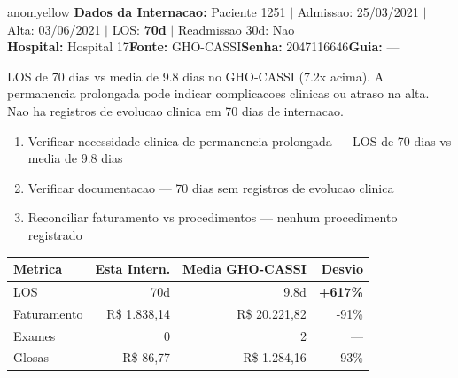 \documentclass[a4paper,10pt]{article}
\begin{document}
\newpage

\begin{anomalycard}[Internacao 1045 | GHO-CASSI | MODERADO (z=2.20)]{anomyellow}
\textbf{Dados da Internacao:} Paciente 1251 $\mid$ Admissao: 25/03/2021 $\mid$ Alta: 03/06/2021 $\mid$ LOS: \textbf{70d} $\mid$ Readmissao 30d: Nao\\
\textbf{Hospital:} Hospital 17\quad\textbf{Fonte:} GHO-CASSI\quad\textbf{Senha:} 2047116646\quad\textbf{Guia:} ---\\
\vspace{2pt}\begin{tcolorbox}[colback=severityred!20,colframe=anomyellow,title={\textbf{Interpretacao de Negocio}},fonttitle=\bfseries\small,left=4pt,right=4pt,top=3pt,bottom=3pt]
{\small LOS de 70 dias vs media de 9.8 dias no GHO-CASSI (7.2x acima). A permanencia prolongada pode indicar complicacoes clinicas ou atraso na alta. Nao ha registros de evolucao clinica em 70 dias de internacao.}
\end{tcolorbox}
\begin{tcolorbox}[colback=severityyellow!30,colframe=anomorange,title={\textbf{Recomendacoes Especificas}},fonttitle=\bfseries\small,left=4pt,right=4pt,top=3pt,bottom=3pt]
\begin{enumerate}[nosep,leftmargin=16pt]
\item {\small Verificar necessidade clinica de permanencia prolongada --- LOS de 70 dias vs media de 9.8 dias}
\item {\small Verificar documentacao --- 70 dias sem registros de evolucao clinica}
\item {\small Reconciliar faturamento vs procedimentos --- nenhum procedimento registrado}
\end{enumerate}
\end{tcolorbox}
\begin{center}\begin{tabular}{l r r r}\toprule\textbf{Metrica} & \textbf{Esta Intern.} & \textbf{Media GHO-CASSI} & \textbf{Desvio} \\\midrule
LOS & 70d & 9.8d & \textcolor{anomred}{\textbf{+617\%}} \\
Faturamento & R\$ 1.838,14 & R\$ 20.221,82 & -91\% \\
Exames & 0 & 2 & --- \\
Glosas & R\$ 86,77 & R\$ 1.284,16 & -93\% \\
\bottomrule\end{tabular}\end{center}


\end{anomalycard}
\end{document}
